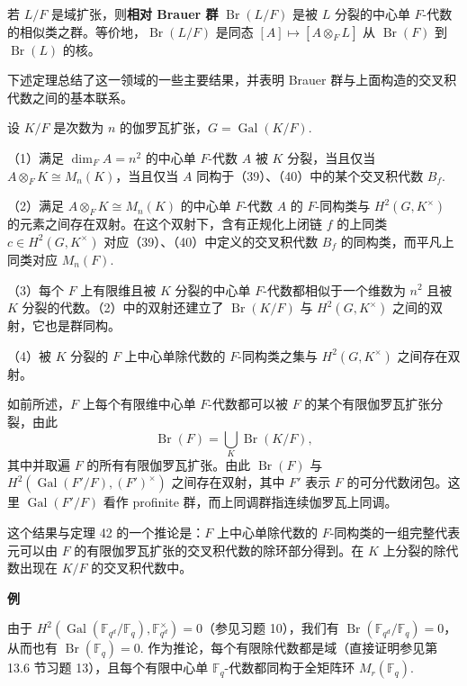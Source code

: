\begin{definition}
若 \(L/F\) 是域扩张，则\textbf{相对 Brauer 群} \(\operatorname{Br}(L/F)\) 是被 \(L\) 分裂的中心单 \(F\)-代数的相似类之群。等价地，\(\operatorname{Br}(L/F)\) 是同态 \([A] \mapsto [A \otimes_FL]\) 从 \(\operatorname{Br}(F)\) 到 \(\operatorname{Br}(L)\) 的核。
\end{definition}

下述定理总结了这一领域的一些主要结果，并表明 Brauer 群与上面构造的交叉积代数之间的基本联系。

\begin{theorem}\label{thm:17.42}
设 \(K/F\) 是次数为 \(n\) 的伽罗瓦扩张，\(G = \operatorname{Gal}(K/F)\).

（1）满足 \(\dim_FA = n^2\) 的中心单 \(F\)-代数 \(A\) 被 \(K\) 分裂，当且仅当 \(A \otimes_FK \cong M_n(K)\)，当且仅当 \(A\) 同构于（39）、（40）中的某个交叉积代数 \(B_f\).

（2）满足 \(A \otimes_FK \cong M_n(K)\) 的中心单 \(F\)-代数 \(A\) 的 \(F\)-同构类与 \(H^2(G, K^\times)\) 的元素之间存在双射。在这个双射下，含有正规化上闭链 \(f\) 的上同类 \(c \in H^2(G, K^\times)\) 对应（39）、（40）中定义的交叉积代数 \(B_f\) 的同构类，而平凡上同类对应 \(M_n(F)\).

（3）每个 \(F\) 上有限维且被 \(K\) 分裂的中心单 \(F\)-代数都相似于一个维数为 \(n^2\) 且被 \(K\) 分裂的代数。（2）中的双射还建立了 \(\operatorname{Br}(K/F)\) 与 \(H^2(G, K^\times)\) 之间的双射，它也是群同构。

（4）被 \(K\) 分裂的 \(F\) 上中心单除代数的 \(F\)-同构类之集与 \(H^2(G, K^\times)\) 之间存在双射。
\end{theorem}

如前所述，\(F\) 上每个有限维中心单 \(F\)-代数都可以被 \(F\) 的某个有限伽罗瓦扩张分裂，由此
\[
\operatorname{Br}(F) = \bigcup_K\operatorname{Br}(K/F),
\]
其中并取遍 \(F\) 的所有有限伽罗瓦扩张。由此 \(\operatorname{Br}(F)\) 与 \(H^2(\operatorname{Gal}(F'/F), (F')^\times)\) 之间存在双射，其中 \(F'\) 表示 \(F\) 的可分代数闭包。这里 \(\operatorname{Gal}(F'/F)\) 看作 profinite 群，而上同调群指连续伽罗瓦上同调。

这个结果与定理 42 的一个推论是：\(F\) 上中心单除代数的 \(F\)-同构类的一组完整代表元可以由 \(F\) 的有限伽罗瓦扩张的交叉积代数的除环部分得到。在 \(K\) 上分裂的除代数出现在 \(K/F\) 的交叉积代数中。

\noindent\textbf{例}

由于 \(H^2(\operatorname{Gal}(\mathbb{F}_{q^d}/\mathbb{F}_q), \mathbb{F}_{q^d}^\times) = 0\)（参见习题 10），我们有 \(\operatorname{Br}(\mathbb{F}_{q^d}/\mathbb{F}_q) = 0\)，从而也有 \(\operatorname{Br}(\mathbb{F}_q) = 0\). 作为推论，每个有限除代数都是域（直接证明参见第 13.6 节习题 13），且每个有限中心单 \(\mathbb{F}_q\)-代数都同构于全矩阵环 \(M_r(\mathbb{F}_q)\).

